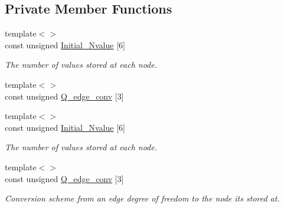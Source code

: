 \subsection*{Private Member Functions}
\begin{DoxyCompactItemize}
\item 
{\footnotesize template$<$$>$ }\\const unsigned \hyperlink{classoomph_1_1TAxisymmetricPoroelasticityElement_aaa52c5f73e3c65cc4ade9b51cd55f021}{Initial\+\_\+\+Nvalue} \mbox{[}6\mbox{]}
\begin{DoxyCompactList}\small\item\em The number of values stored at each node. \end{DoxyCompactList}\item 
{\footnotesize template$<$$>$ }\\const unsigned \hyperlink{classoomph_1_1TAxisymmetricPoroelasticityElement_a433c2b7027ae1c718c085cc79c525baa}{Q\+\_\+edge\+\_\+conv} \mbox{[}3\mbox{]}
\item 
{\footnotesize template$<$$>$ }\\const unsigned \hyperlink{classoomph_1_1TAxisymmetricPoroelasticityElement_a713b2c484b3c4a063a83557507a69400}{Initial\+\_\+\+Nvalue} \mbox{[}6\mbox{]}
\begin{DoxyCompactList}\small\item\em The number of values stored at each node. \end{DoxyCompactList}\item 
{\footnotesize template$<$$>$ }\\const unsigned \hyperlink{classoomph_1_1TAxisymmetricPoroelasticityElement_ac69d7e0179db6881c04d702075e7b54b}{Q\+\_\+edge\+\_\+conv} \mbox{[}3\mbox{]}
\begin{DoxyCompactList}\small\item\em Conversion scheme from an edge degree of freedom to the node it\textquotesingle{}s stored at. \end{DoxyCompactList}\end{DoxyCompactItemize}
